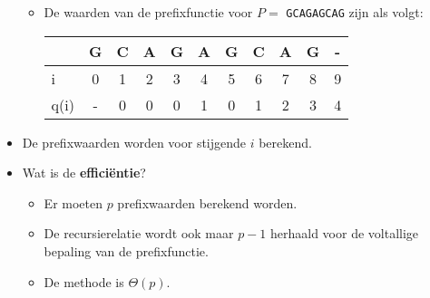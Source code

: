 \begin{itemize}
    \begin{itemize}
        \item De waarden van de prefixfunctie voor $P = $ \texttt{GCAGAGCAG} zijn als volgt:
        \begin{table}[ht]
            \centering
            \begin{tabular}{l | c c c c c c c c c c }
                     & G & C & A & G & A & G & C & A & G & -\\
                     \hline
                i    & 0 & 1 & 2 & 3 & 4 & 5 & 6 & 7 & 8 & 9   \\
                q(i) & - & 0 & 0 & 0 & 1 & 0 & 1 & 2 & 3 & 4 
            \end{tabular}
        \end{table}
    \end{itemize}
    \item De prefixwaarden worden voor stijgende $i$ berekend.
    \item Wat is de \textbf{efficiëntie}?
    \begin{itemize}
        \item Er moeten $p$ prefixwaarden berekend worden.
        \item De recursierelatie wordt ook maar $p-1$ herhaald voor de voltallige bepaling van de prefixfunctie.
        \item De methode is $\Theta(p)$.
    \end{itemize}
\end{itemize}


